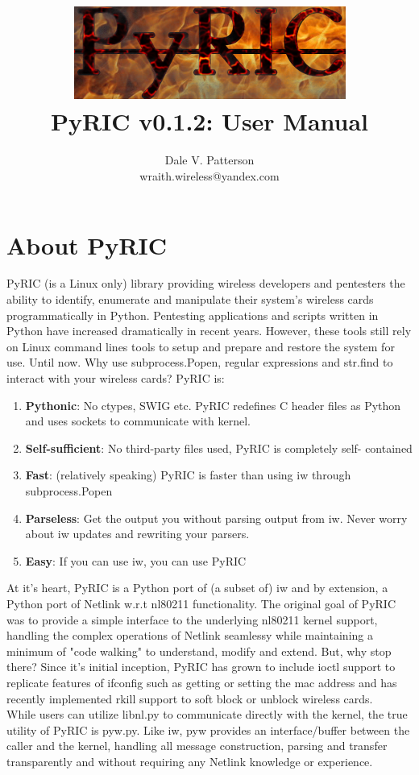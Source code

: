 \documentclass[11pt]{article}
\title{\includegraphics[scale=1]{logo}\\ PyRIC v0.1.2: User Manual}
\author{Dale V. Patterson\\ wraith.wireless@yandex.com}
\begin{document}
\maketitle
\tableofcontents

\section{About PyRIC}\label{sec:About}
PyRIC (is a Linux only) library providing wireless developers and pentesters the
ability to identify, enumerate and manipulate their system's wireless cards
programmatically in Python. Pentesting applications and scripts written in Python
have increased dramatically in recent years. However, these tools still rely on
Linux command lines tools to setup and prepare and restore the system for use.
Until now. Why use subprocess.Popen, regular expressions and str.find to interact
with your wireless cards? PyRIC is:
\begin{enumerate}
\item \textbf{Pythonic}: No ctypes, SWIG etc. PyRIC redefines C header files as 
Python and uses sockets to communicate with kernel.
\item \textbf{Self-sufficient}: No third-party files used, PyRIC is completely self-
contained
\item \textbf{Fast}: (relatively speaking) PyRIC is faster than using iw through 
subprocess.Popen
\item \textbf{Parseless}: Get the output you without parsing output from iw. Never 
worry about iw updates and rewriting your parsers.
\item \textbf{Easy}: If you can use iw, you can use PyRIC
\end{enumerate}

At it's heart, PyRIC is a Python port of (a subset of) iw and by extension, a
Python port of Netlink w.r.t nl80211 functionality. The original goal of PyRIC
was to provide a simple interface to the underlying nl80211 kernel support,
handling the complex operations of Netlink seamlessy while maintaining a minimum
of "code walking" to understand, modify and extend. But, why stop there? Since
it's initial inception, PyRIC has grown to include ioctl support to replicate
features of ifconfig such as getting or setting the mac address and has recently
implemented rkill support to soft block or unblock wireless cards.\\

While users can utilize libnl.py to communicate directly with the kernel, the
true utility of PyRIC is pyw.py. Like iw, pyw provides an interface/buffer 
between the caller and the kernel, handling all message construction, parsing 
and transfer transparently and without requiring any Netlink knowledge or 
experience. \\
\end{document}
